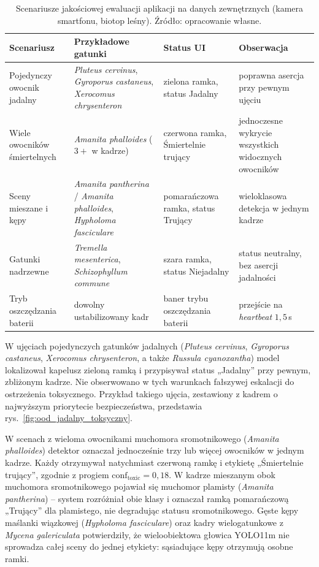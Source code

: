 \begin{table}[htbp]
 \centering
 \small
 \caption{Scenariusze jakościowej ewaluacji aplikacji na danych zewnętrznych (kamera smartfonu, biotop leśny). Źródło: opracowanie własne.}
 \label{tab:ood_scenariusze}
 \begin{tabular}{|p{2.55cm}|p{4.15cm}|p{3.55cm}|p{3.15cm}|}
 \hline
 \textbf{Scenariusz} & \textbf{Przykładowe gatunki} & \textbf{Status UI} & \textbf{Obserwacja} \\
 \hline \hline
 Pojedynczy owocnik jadalny & \textit{Pluteus cervinus}, \textit{Gyroporus castaneus}, \textit{Xerocomus chrysenteron} & zielona ramka, status Jadalny & poprawna asercja przy pewnym ujęciu \\
 \hline
 Wiele owocników śmiertelnych & \textit{Amanita phalloides} ($3+$ w kadrze) & czerwona ramka, Śmiertelnie trujący & jednoczesne wykrycie wszystkich widocznych owocników \\
 \hline
 Sceny mieszane i kępy & \textit{Amanita pantherina} / \textit{Amanita phalloides}, \textit{Hypholoma fasciculare} & pomarańczowa ramka, status Trujący & wieloklasowa detekcja w jednym kadrze \\
 \hline
 Gatunki nadrzewne & \textit{Tremella mesenterica}, \textit{Schizophyllum commune} & szara ramka, status Niejadalny & status neutralny, bez asercji jadalności \\
 \hline
 Tryb oszczędzania baterii & dowolny ustabilizowany kadr & baner trybu oszczędzania baterii & przejście na \textit{heartbeat} $1{,}5$\,s \\
 \hline
 \end{tabular}
\end{table}

W ujęciach pojedynczych gatunków jadalnych (\textit{Pluteus cervinus}, \textit{Gyroporus castaneus}, \textit{Xerocomus chrysenteron}, a także \textit{Russula cyanoxantha}) model lokalizował kapelusz zieloną ramką i przypisywał status „Jadalny” przy pewnym, zbliżonym kadrze. Nie obserwowano w tych warunkach fałszywej eskalacji do ostrzeżenia toksycznego. Przykład takiego ujęcia, zestawiony z kadrem o najwyższym priorytecie bezpieczeństwa, przedstawia rys.~\ref{fig:ood_jadalny_toksyczny}.

W scenach z wieloma owocnikami muchomora sromotnikowego (\textit{Amanita phalloides}) detektor oznaczał jednocześnie trzy lub więcej owocników w jednym kadrze. Każdy otrzymywał natychmiast czerwoną ramkę i etykietę „Śmiertelnie trujący”, zgodnie z progiem $\mathrm{conf}_{\mathrm{toxic}}=0{,}18$. W kadrze mieszanym obok muchomora sromotnikowego pojawiał się muchomor plamisty (\textit{Amanita pantherina}) -- system rozróżniał obie klasy i oznaczał ramką pomarańczową „Trujący” dla plamistego, nie degradując statusu sromotnikowego. Gęste kępy maślanki wiązkowej (\textit{Hypholoma fasciculare}) oraz kadry wielogatunkowe z \textit{Mycena galericulata} potwierdziły, że wieloobiektowa głowica YOLO11m nie sprowadza całej sceny do jednej etykiety: sąsiadujące kępy otrzymują osobne ramki.

